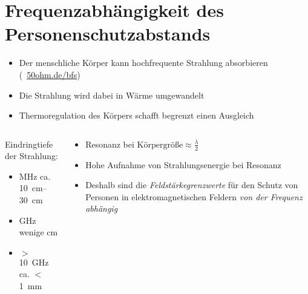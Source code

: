 
\section{Frequenzabhängigkeit des Personenschutzabstands}
\label{section:personenschutzabstand_frequenzabhaengig}
\begin{frame}%
\begin{itemize}
  \item Der menschliche Körper kann hochfrequente Strahlung absorbieren (\textcolor{DARCblue}{\faLink~\href{https://50ohm.de/bfs}{50ohm.de/bfs}})
  \item Die Strahlung wird dabei in Wärme umgewandelt
  \item Thermoregulation des Körpers schafft begrenzt einen Ausgleich
  \end{itemize}
\end{frame}

\begin{frame}
\begin{columns}
    \begin{column}{0.48\textwidth}
    Eindringtiefe der Strahlung:

\begin{itemize}
  \item MHz ca. \qtyrange{10}{30}{\centi\metre}
  \item GHz wenige cm
  \item $>$\qty{10}{\giga\hertz} ca. $<$ \qty{1}{\milli\metre}
  \end{itemize}

    \end{column}
   \begin{column}{0.48\textwidth}
       \begin{itemize}
  \item Resonanz bei $\textrm{Körpergröße} \approx \frac{\lambda}{2}$
  \item Hohe Aufnahme von Strahlungsenergie bei Resonanz
  \item Deshalb sind die \emph{Feldstärkegrenzwerte} für den Schutz von Personen in elektromagnetischen Feldern \emph{von der Frequenz abhängig}
  \end{itemize}

   \end{column}
\end{columns}

\end{frame}

